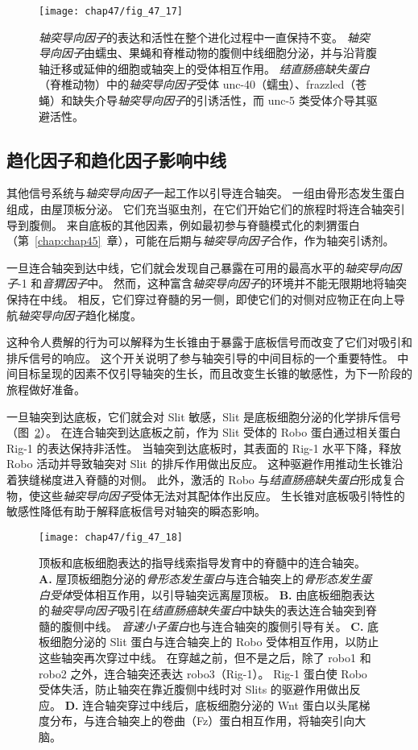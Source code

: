 \begin{figure}[htbp]
	\centering
	\texttt{[image: chap47/fig\_47\_17]}
	\caption{\textit{轴突导向因子}的表达和活性在整个进化过程中一直保持不变。
		\textit{轴突导向因子}由蠕虫、果蝇和脊椎动物的腹侧中线细胞分泌，并与沿背腹轴迁移或延伸的细胞或轴突上的受体相互作用。
		\textit{结直肠癌缺失蛋白}（脊椎动物）中的\textit{轴突导向因子}受体 unc-40（蠕虫）、frazzled（苍蝇）和缺失介导\textit{轴突导向因子}的引诱活性，而 unc-5 类受体介导其驱避活性。}
	\label{fig:47_17}
\end{figure}



\subsection{趋化因子和趋化因子影响中线}

其他信号系统与\textit{轴突导向因子}一起工作以引导连合轴突。
一组由骨形态发生蛋白组成，由屋顶板分泌。
它们充当驱虫剂，在它们开始它们的旅程时将连合轴突引导到腹侧。
来自底板的其他因素，例如最初参与脊髓模式化的刺猬蛋白（第~\ref{chap:chap45}~章），可能在后期与\textit{轴突导向因子}合作，作为轴突引诱剂。


一旦连合轴突到达中线，它们就会发现自己暴露在可用的最高水平的\textit{轴突导向因子}-1 和\textit{音猬因子}中。
然而，这种富含\textit{轴突导向因子}的环境并不能无限期地将轴突保持在中线。
相反，它们穿过脊髓的另一侧，即使它们的对侧对应物正在向上导航\textit{轴突导向因子}趋化梯度。


这种令人费解的行为可以解释为生长锥由于暴露于底板信号而改变了它们对吸引和排斥信号的响应。
这个开关说明了参与轴突引导的中间目标的一个重要特性。
中间目标呈现的因素不仅引导轴突的生长，而且改变生长锥的敏感性，为下一阶段的旅程做好准备。


一旦轴突到达底板，它们就会对 Slit 敏感，Slit 是底板细胞分泌的化学排斥信号（图~\ref{fig:47_18}）。
在连合轴突到达底板之前，作为 Slit 受体的 Robo 蛋白通过相关蛋白 Rig-1 的表达保持非活性。
当轴突到达底板时，其表面的 Rig-1 水平下降，释放 Robo 活动并导致轴突对 Slit 的排斥作用做出反应。
这种驱避作用推动生长锥沿着狭缝梯度进入脊髓的对侧。
此外，激活的 Robo 与\textit{结直肠癌缺失蛋白}形成复合物，使这些\textit{轴突导向因子}受体无法对其配体作出反应。
生长锥对底板吸引特性的敏感性降低有助于解释底板信号对轴突的瞬态影响。


\begin{figure}[htbp]
	\centering
	\texttt{[image: chap47/fig\_47\_18]}
	\caption{顶板和底板细胞表达的指导线索指导发育中的脊髓中的连合轴突。
		\textbf{A.} 屋顶板细胞分泌的\textit{骨形态发生蛋白}与连合轴突上的\textit{骨形态发生蛋白受体}受体相互作用，以引导轴突远离屋顶板。
		\textbf{B.} 由底板细胞表达的\textit{轴突导向因子}吸引在\textit{结直肠癌缺失蛋白}中缺失的表达连合轴突到脊髓的腹侧中线。
		\textit{音速小子蛋白}也与连合轴突的腹侧引导有关。
		\textbf{C.} 底板细胞分泌的 Slit 蛋白与连合轴突上的 Robo 受体相互作用，以防止这些轴突再次穿过中线。
		在穿越之前，但不是之后，除了 robo1 和 robo2 之外，连合轴突还表达 robo3（Rig-1）。
		Rig-1 蛋白使 Robo 受体失活，防止轴突在靠近腹侧中线时对 Slits 的驱避作用做出反应。
		\textbf{D.} 连合轴突穿过中线后，底板细胞分泌的 Wnt 蛋白以头尾梯度分布，与连合轴突上的卷曲（Fz）蛋白相互作用，将轴突引向大脑。}
	\label{fig:47_18}
\end{figure}


